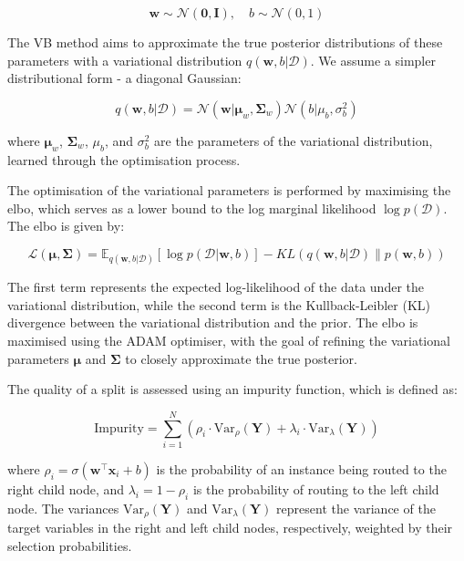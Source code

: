 \documentclass[3p,review,authoryear]{elsarticle}
\begin{document}
\begin{equation}
\mathbf{w} \sim \mathcal{N}(\mathbf{0}, \mathbf{I}), \quad b \sim \mathcal{N}(0, 1)
\end{equation}

The VB method aims to approximate the true posterior distributions of these parameters with a variational distribution \(q(\mathbf{w}, b|\mathcal{D})\).
We assume a simpler distributional form - a diagonal Gaussian:

\begin{equation}
q(\mathbf{w}, b|\mathcal{D}) = \mathcal{N}(\mathbf{w}|\boldsymbol{\mu}_w, \boldsymbol{\Sigma}_w) \mathcal{N}(b|\mu_b, \sigma_b^2)
\end{equation}

where \(\boldsymbol{\mu}_w\), \(\boldsymbol{\Sigma}_w\), \(\mu_b\), and \(\sigma_b^2\) are the parameters of the variational distribution, learned through the optimisation process.

The optimisation of the variational parameters is performed by maximising the \gls{elbo}, which serves as a lower bound to the log marginal likelihood \(\log p(\mathcal{D})\).
The \gls{elbo} is given by:

\begin{equation}
\mathcal{L}(\boldsymbol{\mu}, \boldsymbol{\Sigma}) = \mathbb{E}_{q(\mathbf{w}, b|\mathcal{D})}\left[\log p(\mathcal{D}|\mathbf{w}, b)\right] - KL\left(q(\mathbf{w}, b|\mathcal{D}) \parallel p(\mathbf{w}, b)\right)
\label{eq:elbo}
\end{equation}

The first term represents the expected log-likelihood of the data under the variational distribution, while the second term is the Kullback-Leibler (KL) divergence between the variational distribution and the prior. The \gls{elbo} is maximised using the ADAM optimiser, with the goal of refining the variational parameters \(\boldsymbol{\mu}\) and \(\boldsymbol{\Sigma}\) to closely approximate the true posterior.

The quality of a split is assessed using an impurity function, which is defined as:

\begin{equation}
\text{Impurity} = \sum_{i=1}^{N} \left(\rho_i \cdot \text{Var}_{\rho}(\mathbf{Y}) + \lambda_i \cdot \text{Var}_{\lambda}(\mathbf{Y})\right)
\end{equation}

where \(\rho_i = \sigma(\mathbf{w}^\top \mathbf{x}_i + b)\) is the probability of an instance being routed to the right child node, and \(\lambda_i = 1 - \rho_i\) is the probability of routing to the left child node.
The variances \(\text{Var}_{\rho}(\mathbf{Y})\) and \(\text{Var}_{\lambda}(\mathbf{Y})\) represent the variance of the target variables in the right and left child nodes, respectively, weighted by their selection probabilities.
\end{document}
